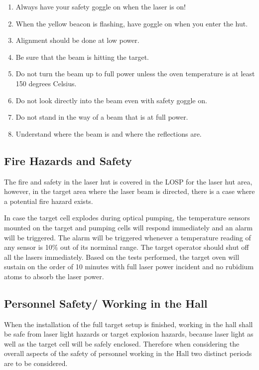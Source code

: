 \begin{safetyen}{10}{5}
\begin{enumerate}
\item Always have your safety goggle on when the laser is on!
\item When the yellow beacon is flashing, have goggle on when you enter
the hut.
\item Alignment should be done at low power.
\item Be sure that the beam is hitting the target.
\item Do not turn the beam up to full power unless the oven temperature
is at least 150 degrees Celsius.
\item Do not look directly into the beam even with safety goggle on.
\item Do not stand in the way of a beam that is at full power.
\item Understand where the beam is and where the reflections are.
\end{enumerate}

\subsection{Fire Hazards and Safety}
\label{sec:fire}

The fire and safety in the laser hut is covered in the LOSP
for the laser hut area,
however, in the target area where the laser beam is directed, there is a
case where a potential 
fire hazard exists. 

In case the target cell explodes during optical pumping, the temperature 
sensors mounted on the target and pumping cells will respond immediately and 
an alarm will be triggered. The alarm will be triggered whenever 
a temperature reading of any sensor is 10$\%$ out of its norminal range.
The target operator should shut off all the lasers immediately.
Based on the tests performed, the target oven will sustain on the order of 10 
minutes with full laser power incident and no rubidium atoms 
to absorb the laser power.


\subsection{Personnel Safety/ Working in the Hall}
\label{sec:prs}

When the installation of the full target setup is finished, working in
the hall
shall be safe from laser light hazards or target explosion hazards,
because 
laser light as  well as the target cell will be safely enclosed.
Therefore 
when considering the overall aspects of the safety of personnel working
in the
Hall two distinct periods are to be considered.


\end{safetyen}
